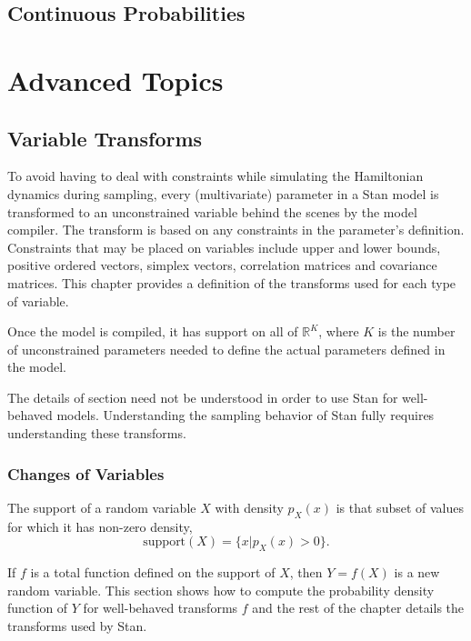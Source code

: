 \documentclass[10pt]{report}
\newcommand{\Stan}{Stan\xspace}
\begin{document}
\chapter{Continuous Probabilities}\label{continuous-prob-functions.chapter}


\part{Advanced Topics}


\chapter{Variable Transforms}

To avoid having to deal with constraints while simulating the
Hamiltonian dynamics during sampling, every (multivariate) parameter
in a \Stan model is transformed to an unconstrained variable behind
the scenes by the model compiler.  The transform is based on any
constraints in the parameter's definition.  Constraints that may be
placed on variables include upper and lower bounds, positive ordered
vectors, simplex vectors, correlation matrices and covariance
matrices.  This chapter provides a definition of the transforms used
for each type of variable.

Once the model is compiled, it has support on all of
$\mathbb{R}^K$, where $K$ is the number of unconstrained parameters
needed to define the actual parameters defined in the model.

The details of section need not be understood in order to use
\Stan for well-behaved models.  Understanding the sampling behavior
of \Stan fully requires understanding these transforms.


\section{Changes of Variables}\label{change-of-variables.section}

The support of a random variable $X$ with density $p_X(x)$ is that
subset of values for which it has non-zero density,
%
\[
\mbox{support}(X) = \{ x | p_X(x) > 0 \}.
\]

If $f$ is a total function defined on the support of $X$, then $Y =
f(X)$ is a new random variable.  This section shows how to compute the
probability density function of $Y$ for well-behaved transforms $f$
and the rest of the chapter details the transforms used by \Stan.
\end{document}

